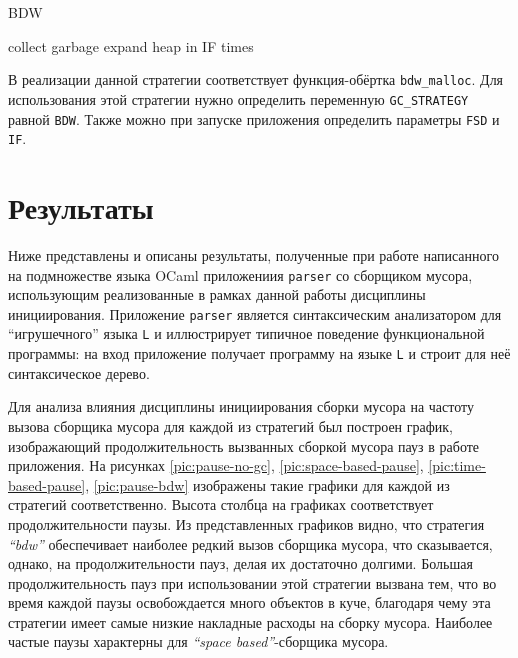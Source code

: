 \documentclass[14pt]{extarticle}
\begin{document}
\begin{algorithm}[hbt]
\caption{BDW}
\label{BDW-algo1}
\begin{algorithmic}[1]
        \State collect garbage
    \Else 
        \State expand heap in IF times
    \EndIf
\EndIf
\end{algorithmic}
\end{algorithm}

В реализации данной стратегии соответствует функция-обёртка \texttt{bdw\_malloc}. Для использования
этой стратегии нужно определить переменную \texttt{GC\_STRATEGY} равной \texttt{BDW}. Также можно при запуске приложения
определить параметры \texttt{FSD} и \texttt{IF}.

\pagebreak
\newpage
\newpage
\section{Результаты}

Ниже представлены и описаны результаты, полученные при работе написанного на 
подмножестве языка OCaml приложениия \texttt{parser} со сборщиком мусора,
использующим реализованные в рамках данной работы дисциплины инициирования.
Приложение \texttt{parser} является
синтаксическим анализатором для ``игрушечного'' языка \texttt{L} и иллюстрирует типичное
поведение функциональной программы: на вход приложение получает программу на языке 
\texttt{L}
и строит для неё синтаксическое дерево. 


Для анализа влияния дисциплины инициирования сборки мусора на частоту вызова сборщика
мусора для каждой из стратегий был построен график, изображающий продолжительность 
вызванных сборкой мусора пауз в 
работе приложения. На рисунках \ref{pic:pause-no-gc},
\ref{pic:space-based-pause}, \ref{pic:time-based-pause}, \ref{pic:pause-bdw} 
изображены такие графики для каждой из стратегий соответственно. Высота столбца на графиках
соответствует продолжительности паузы. Из представленных графиков видно, что
стратегия \textit{``bdw''} обеспечивает наиболее редкий вызов сборщика мусора, что сказывается,
однако, на продолжительности пауз, делая их достаточно долгими. 
Большая продолжительность пауз при использовании этой стратегии вызвана
тем, что во время каждой паузы освобождается много объектов в куче,
благодаря чему эта стратегии имеет самые низкие накладные расходы на сборку
мусора. Наиболее частые паузы характерны для \textit{``space based''}-сборщика мусора. 
\end{document}
